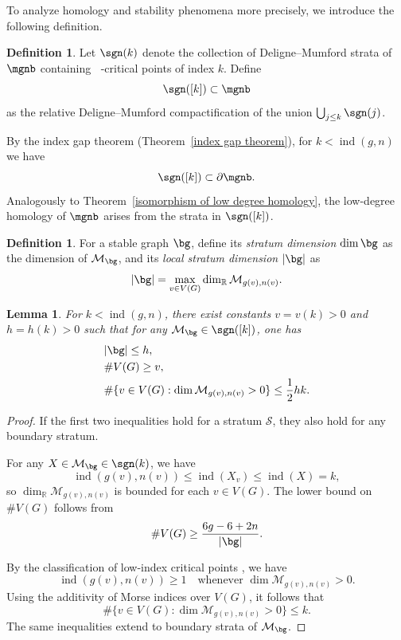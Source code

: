 \documentclass[12pt]{amsart}
\newtheorem{lemma}[theorem]{Lemma}
\theoremstyle{remark}
\theoremstyle{definition}
\newtheorem{definition}[theorem]{Definition}
\DeclareMathOperator{\ind}{ind}
\DeclareMathOperator{\syst}{sys_T}
\numberwithin{equation}{section}
\begin{document}
To analyze homology and stability phenomena more precisely, we introduce the following definition.

\begin{definition}
    Let $\sgn(k)$ denote the collection of Deligne--Mumford strata of $\mgnb$ containing $\syst$-critical points of index $k$. Define
    \[
    \sgn([k]) \subset \mgnb
    \]
    as the relative Deligne--Mumford compactification of the union $\bigcup_{j\le k} \sgn(j)$.
\end{definition}

By the index gap theorem (Theorem~\ref{index gap theorem}), for $k<\ind(g,n)$ we have
\[
\sgn([k]) \subset \partial\mgnb.
\]
Analogously to Theorem~\ref{isomorphism of low degree homology}, the low-degree homology of $\mgnb$ arises from the strata in $\sgn([k])$.



\begin{definition}
For a stable graph $\bg$, define its \emph{stratum dimension} $\dim \bg$ as the dimension of $\mathcal M_\bg$, and its \emph{local stratum dimension} $|\bg|$ as
\[
|\bg| = \max_{v \in V(G)} \dim_{\mathbb R} \mathcal M_{g(v),n(v)}.
\]
\end{definition}

\begin{lemma} 
For $k<\ind(g,n)$, there exist constants $v=v(k)>0$ and $h=h(k)>0$ such that for any $\mathcal M_\bg \in \sgn([k])$, one has
\begin{align*}
    &|\bg| \le h,\\
    &\#V(G) \ge v,\\
    &\#\{v\in V(G) : \dim \mathcal M_{g(v),n(v)}>0 \} \le \frac{1}{2} hk.
\end{align*}
\end{lemma}

\begin{proof}
If the first two inequalities hold for a stratum $\mathcal S$, they also hold for any boundary stratum.  

For any $X \in \mathcal M_\bg \in \sgn(k)$, we have
\[
\ind(g(v),n(v)) \le \ind(X_v) \le \ind(X) = k,
\]
so $\dim_{\mathbb R} \mathcal M_{g(v),n(v)}$ is bounded for each $v\in V(G)$. The lower bound on $\#V(G)$ follows from
\[
\#V(G) \ge \frac{6g-6+2n}{|\bg|}.
\]

By the classification of low-index critical points \cite{chen2023index}, we have
\[
\ind(g(v),n(v)) \ge 1 \quad \text{whenever } \dim \mathcal M_{g(v),n(v)}>0.
\]
Using the additivity of Morse indices over $V(G)$, it follows that
\[
\#\{v\in V(G) : \dim \mathcal M_{g(v),n(v)}>0 \} \le k.
\]
The same inequalities extend to boundary strata of $\mathcal M_\bg$.
\end{proof}
\end{document}
